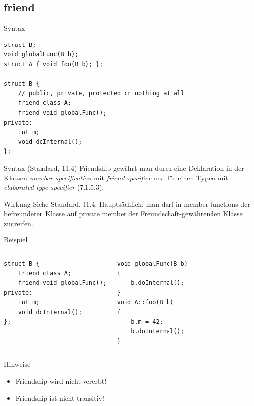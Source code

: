 




\subsection{friend}

\begin{frame}[fragile]{Syntax}
	\begin{lstlisting}
struct B;
void globalFunc(B b);
struct A { void foo(B b); };

struct B {
    // public, private, protected or nothing at all
    friend class A;
    friend void globalFunc();
private:
    int m;
    void doInternal();
};
	\end{lstlisting}
	
	\pause
	
	\begin{block}{Syntax (Standard, 11.4)}
		Friendship gewährt man durch eine Deklaration in der Klassen-\emph{member-specification} mit \emph{friend-specifier} und für einen Typen mit \emph{elaborated-type-specifier} (7.1.5.3).
	\end{block}
\end{frame}


\begin{frame}[fragile]{Wirkung}
	Siehe Standard, 11.4.
	Hauptsächlich: man darf in member functions der befreundeten Klasse auf private member der Freundschaft-gewährenden Klasse zugreifen.
	
	\begin{block}{Beispiel}
		\begin{columns}[t]
			\begin{lstlisting}
struct B {
    friend class A;
    friend void globalFunc();
private:
    int m;
    void doInternal();
};
			\end{lstlisting}
			
			\begin{lstlisting}
void globalFunc(B b)
{
    b.doInternal();
}
void A::foo(B b)
{
    b.m = 42;
    b.doInternal();
}
			\end{lstlisting}
		\end{columns}
	\end{block}
\end{frame}


\begin{frame}{Hinweise}
	\begin{itemize}[<+->]
		\item Friendship wird nicht vererbt!
		\item Friendship ist nicht transitiv!
	\end{itemize}
\end{frame}
